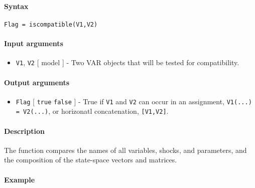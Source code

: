 


	\paragraph{Syntax}\label{syntax}

\begin{verbatim}
Flag = iscompatible(V1,V2)
\end{verbatim}

\paragraph{Input arguments}\label{input-arguments}

\begin{itemize}
\itemsep1pt\parskip0pt
\item
  \texttt{V1}, \texttt{V2} {[} model {]} - Two VAR objects that will be
  tested for compatibility.
\end{itemize}

\paragraph{Output arguments}\label{output-arguments}

\begin{itemize}
\itemsep1pt\parskip0pt
\item
  \texttt{Flag} {[} \texttt{true} \textbar{} \texttt{false} {]} - True
  if \texttt{V1} and \texttt{V2} can occur in an assignment,
  \texttt{V1(...) = V2(...)}, or horizonatl concatenation,
  \texttt{{[}V1,V2{]}}.
\end{itemize}

\paragraph{Description}\label{description}

The function compares the names of all variables, shocks, and
parameters, and the composition of the state-space vectors and matrices.

\paragraph{Example}\label{example}



